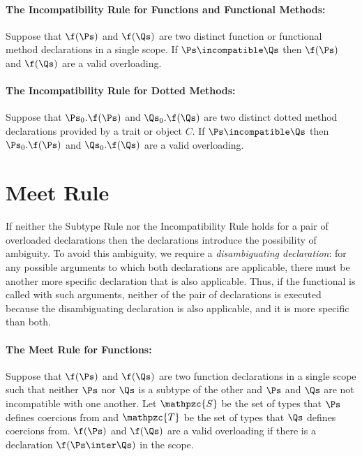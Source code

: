 \paragraph{The Incompatibility Rule for Functions and Functional Methods:}

Suppose that $\f(\Ps)$ and $\f(\Qs)$ are two distinct function or
functional method declarations in a single scope.
If $\Ps \incompatible \Qs$ then $\f(\Ps)$ and $\f(\Qs)$ are a valid overloading.

\paragraph{The Incompatibility Rule for Dotted Methods:}
Suppose that $\Ps_0.\f(\Ps)$ and $\Qs_0.\f(\Qs)$ are two distinct
dotted method declarations provided by a trait or object $C$.  If
$\Ps \incompatible \Qs$ then $\Ps_0.\f(\Ps)$ and $\Qs_0.\f(\Qs)$ are
a valid overloading.

\section{Meet Rule}

If neither the Subtype Rule nor the Incompatibility Rule holds 
for a pair of overloaded declarations 
then the declarations introduce the possibility of ambiguity.  
To avoid this ambiguity, 
we require a \emph{disambiguating declaration}:
for any possible arguments to which both declarations are applicable, 
there must be another more specific declaration that is also applicable.  
Thus, 
if the functional is called with such arguments, 
neither of the pair of declarations is executed 
because the disambiguating declaration is also applicable, 
and it is more specific than both.


\paragraph{The Meet Rule for Functions:}
Suppose that $\f(\Ps)$ and $\f(\Qs)$ are two function
declarations in a single scope
such that neither $\Ps$ nor $\Qs$ is a subtype of the other and $\Ps$ and
$\Qs$ are not incompatible with one another.
Let $\mathpzc{S}$ be the set of types that $\Ps$ defines coercions from
and $\mathpzc{T}$ be the set of types that $\Qs$ defines coercions from.
$\f(\Ps)$ and $\f(\Qs)$ are a valid overloading if
there is a declaration $\f(\Ps \inter \Qs)$ in the scope.

